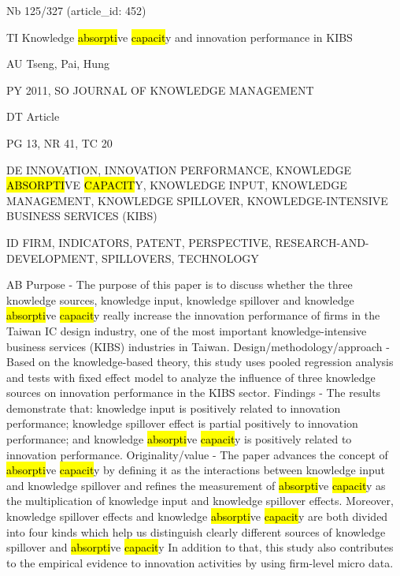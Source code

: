 \documentclass[a4paper]{article}
\begin{document}
\vspace*{-2cm}
Nb \tabto{0cm}125/327 (article\_id: 452)\par
TI \tabto{0cm}Knowledge \hl{absorpti}ve \hl{capacit}y and innovation performance in KIBS\par
AU \tabto{0cm}Tseng, Pai, Hung\par
PY \tabto{0cm}2011, SO JOURNAL OF KNOWLEDGE MANAGEMENT\par
DT \tabto{0cm}Article\par
PG \tabto{0cm}13, NR 41, TC 20\par
DE \tabto{0cm}INNOVATION, INNOVATION PERFORMANCE, KNOWLEDGE \hl{ABSORPTI}VE \hl{CAPACIT}Y, KNOWLEDGE INPUT, KNOWLEDGE MANAGEMENT, KNOWLEDGE SPILLOVER, KNOWLEDGE-INTENSIVE BUSINESS SERVICES (KIBS)\par
ID \tabto{0cm}FIRM, INDICATORS, PATENT, PERSPECTIVE, RESEARCH-AND-DEVELOPMENT, SPILLOVERS, TECHNOLOGY\par
AB \tabto{0cm}Purpose - The purpose of this paper is to discuss whether the three knowledge sources, knowledge input, knowledge spillover and knowledge \hl{absorpti}ve \hl{capacit}y really increase the innovation performance of firms in the Taiwan IC design industry, one of the most important knowledge-intensive business services (KIBS) industries in Taiwan.
Design/methodology/approach - Based on the knowledge-based theory, this study uses pooled regression analysis and tests with fixed effect model to analyze the influence of three knowledge sources on innovation performance in the KIBS sector.
Findings - The results demonstrate that: knowledge input is positively related to innovation performance; knowledge spillover effect is partial positively to innovation performance; and knowledge \hl{absorpti}ve \hl{capacit}y is positively related to innovation performance.
Originality/value - The paper advances the concept of \hl{absorpti}ve \hl{capacit}y by defining it as the interactions between knowledge input and knowledge spillover and refines the measurement of \hl{absorpti}ve \hl{capacit}y as the multiplication of knowledge input and knowledge spillover effects. Moreover, knowledge spillover effects and knowledge \hl{absorpti}ve \hl{capacit}y are both divided into four kinds which help us distinguish clearly different sources of knowledge spillover and \hl{absorpti}ve \hl{capacit}y In addition to that, this study also contributes to the empirical evidence to innovation activities by using firm-level micro data.\par
\clearpage
\end{document}
